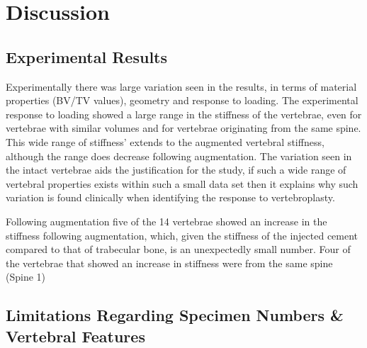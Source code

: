 \section{Discussion}





\subsection{Experimental Results}

Experimentally there was large variation seen in the results, in terms of material properties (BV/TV values), geometry and response to loading.
The experimental response to loading showed a large range in the stiffness of the vertebrae, even for vertebrae with similar volumes and for vertebrae originating from the same spine.
This wide range of stiffness' extends to the augmented vertebral stiffness, although the range does decrease following augmentation.
The variation seen in the intact vertebrae aids the justification for the study, if such a wide range of vertebral properties exists within such a small data set then it explains why such variation is found clinically when identifying the response to vertebroplasty.

Following augmentation five of the 14 vertebrae showed an increase in the stiffness following augmentation, which, given the stiffness of the injected cement compared to that of trabecular bone, is an unexpectedly small number.
Four of the vertebrae that showed an increase in stiffness were from the same spine (Spine 1) 
\subsection{Limitations Regarding Specimen Numbers \& Vertebral Features}

